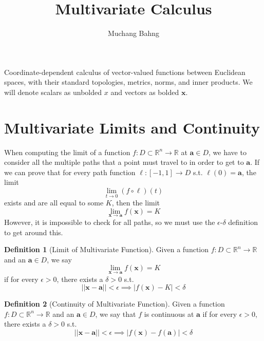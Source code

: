 \documentclass{article}
\theoremstyle{remark}
\theoremstyle{definition}
\newtheorem{definition}{Definition}[section]
\begin{document}
\pagestyle{fancy}

\cfoot{\thepage / \pageref{LastPage}}

\title{Multivariate Calculus}
\author{Muchang Bahng}

\maketitle

Coordinate-dependent calculus of vector-valued functions between Euclidean spaces, with their standard topologies, metrics, norms, and inner products. We will denote scalars as unbolded $x$ and vectors as bolded $\mathbf{x}$. 

\section{Multivariate Limits and Continuity}

When computing the limit of a function $f: D \subset \mathbb{R}^n \longrightarrow \mathbb{R}$ at $\mathbf{a} \in D$, we have to consider all the multiple paths that a point must travel to in order to get to $\mathbf{a}$. If we can prove that for every path function $\ell: [-1, 1] \longrightarrow D$ s.t. $\ell(0) = \mathbf{a}$, the limit 
\[\lim_{t \rightarrow 0} (f \circ \ell)(t)\]
exists and are all equal to some $K$, then the limit 
\[\lim_{\mathbf{x} \rightarrow \mathbf{a}} f(\mathbf{x}) = K\]
However, it is impossible to check for all paths, so we must use the $\epsilon$-$\delta$ definition to get around this. 

\begin{definition}[Limit of Multivariate Function]
Given a function $f: D \subset \mathbb{R}^n \longrightarrow \mathbb{R}$ and an $\mathbf{a} \in D$, we say 
\[\lim_{\mathbf{x} \rightarrow \mathbf{a}} f(\mathbf{x}) = K\]
if for every $\epsilon > 0$, there exists a $\delta > 0$ s.t. 
\[||\mathbf{x} - \mathbf{a}|| < \epsilon \implies |f(\mathbf{x})  - K| < \delta\]
\end{definition}

\begin{definition}[Continuity of Multivariate Function]
Given a function $f: D \subset \mathbb{R}^n \longrightarrow \mathbb{R}$ and an $\mathbf{a} \in D$, we say that $f$ is continuous at $\mathbf{a}$ if for every $\epsilon > 0$, there exists a $\delta > 0$ s.t. 
\[||\mathbf{x} - \mathbf{a}|| < \epsilon \implies |f(\mathbf{x})  - f(\mathbf{a})| < \delta\]
\end{definition}
\end{document}
